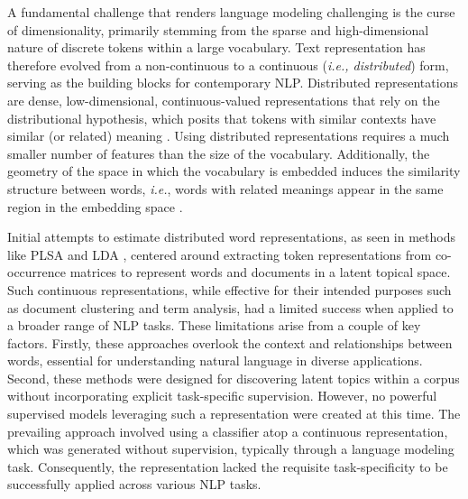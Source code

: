 A fundamental challenge that renders language modeling challenging is the curse of dimensionality, primarily stemming from the sparse and high-dimensional nature of discrete tokens within a large vocabulary. Text representation has therefore evolved from a non-continuous to a continuous (\textit{i.e., distributed}) form, serving as the building blocks for contemporary \ac{NLP}. Distributed representations are dense, low-dimensional, continuous-valued representations that rely on the distributional hypothesis, which posits that tokens with similar contexts have similar (or related) meaning \citep{mikolov2013efficient}. Using distributed representations requires a much smaller number of features than the size of the vocabulary. Additionally, the geometry of the space in which the vocabulary is embedded induces the similarity structure between words, \textit{i.e.}, words with related meanings appear in the same region in the embedding space \citep{shazeer2016swivel}.

Initial attempts to estimate distributed word representations, as seen in methods like \ac{PLSA} \citep{hofmann2001unsupervised} and \ac{LDA} \citep{blei2003latent}, centered around extracting token representations from co-occurrence matrices to represent words and documents in a latent topical space. Such continuous representations, while effective for their intended purposes such as document clustering and term analysis, had a limited success when applied to a broader range of \ac{NLP} tasks. These limitations arise from a couple of key factors. Firstly, these approaches overlook the context and relationships between words, essential for understanding natural language in diverse applications. Second, these methods were designed for discovering latent topics within a corpus without incorporating explicit task-specific supervision. However, no powerful supervised models leveraging such a representation were created at this time. The prevailing approach involved using a classifier atop a continuous representation, which was generated without supervision, typically through a language modeling task. Consequently, the representation lacked the requisite task-specificity to be successfully applied across various \ac{NLP} tasks.

